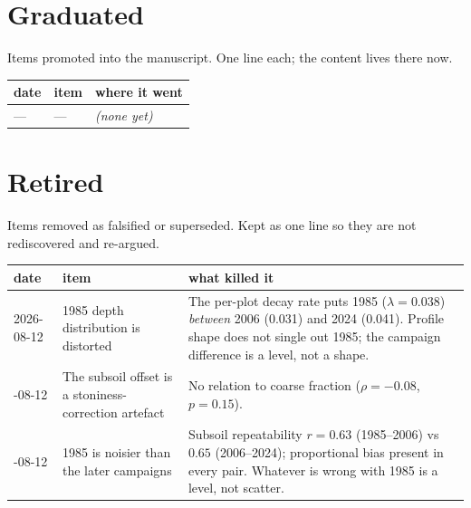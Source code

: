 \documentclass[11pt]{article}
\begin{document}
\section{Graduated}

\noindent Items promoted into the manuscript. One line each; the content lives there now.

\begin{center}\small
\begin{tabular}{llp{7.6cm}}
\toprule
date & item & where it went\\
\midrule
--- & --- & \emph{(none yet)}\\
\bottomrule
\end{tabular}
\end{center}

\section{Retired}

\noindent Items removed as falsified or superseded. Kept as one line so they are not
rediscovered and re-argued.

\begin{center}\small
\begin{tabular}{llp{7.6cm}}
\toprule
date & item & what killed it\\
\midrule
2026-08-12 & 1985 depth distribution is distorted & The per-plot decay rate puts 1985
($\lambda=0.038$) \emph{between} 2006 (0.031) and 2024 (0.041). Profile shape does not
single out 1985; the campaign difference is a level, not a shape.\\
\addlinespace
2026-08-12 & The subsoil offset is a stoniness-correction artefact & No relation to coarse
fraction ($\rho=-0.08$, $p=0.15$).\\
\addlinespace
2026-08-12 & 1985 is noisier than the later campaigns & Subsoil repeatability $r=0.63$
(1985--2006) vs $0.65$ (2006--2024); proportional bias present in every pair. Whatever is
wrong with 1985 is a level, not scatter.\\
\bottomrule
\end{tabular}
\end{center}
\end{document}
